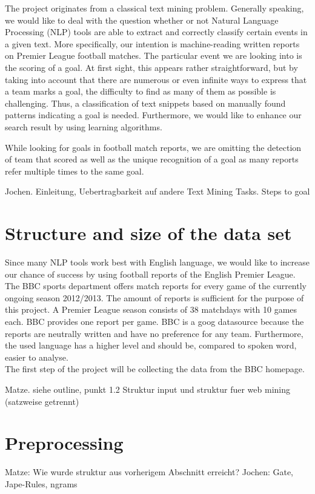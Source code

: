 \documentclass[11pt,titlepage,oneside,openany]{book}
\begin{document}
The project originates from a classical text mining problem. Generally speaking, we would like to deal with the question whether or not Natural Language Processing (NLP) tools are able to extract and correctly classify certain events in a given text. More specifically, our intention is machine-reading written reports on Premier League football matches. The particular event we are looking into is the scoring of a goal. At first sight, this appears rather straightforward, but by taking into account that there are numerous or even infinite ways to express that a team marks a goal, the difficulty to find as many of them as possible is challenging. Thus, a classification of text snippets based on manually found patterns indicating a goal is needed. Furthermore, we would like to enhance our search result by using learning algorithms.  

While looking for goals in football match reports, we are omitting the detection of team that scored as well as the unique recognition of a goal as many reports refer multiple times to the same goal.

Jochen. Einleitung, Uebertragbarkeit auf andere Text Mining Tasks. Steps to goal

\section{Structure and size of the data set}

Since many NLP tools work best with English language, we would like to increase our chance of success by using football reports of the English Premier League. The BBC sports department offers match reports for every game of the currently ongoing season 2012/2013. The amount of reports is sufficient for the purpose of this project. A Premier League season consists of 38 matchdays with 10 games each. BBC provides one report per game. BBC is a goog datasource because the reports are neutrally written and have no preference for any team. Furthermore, the used language has a higher level and should be, compared to spoken word, easier to analyse. \\
The first step of the project will be collecting the data from the BBC homepage. 	

Matze. siehe outline, punkt 1.2 Struktur input und struktur fuer web mining (satzweise getrennt)

\section{Preprocessing}
Matze: Wie wurde struktur aus vorherigem Abschnitt erreicht? 
Jochen: Gate, Jape-Rules, ngrams
\end{document}
